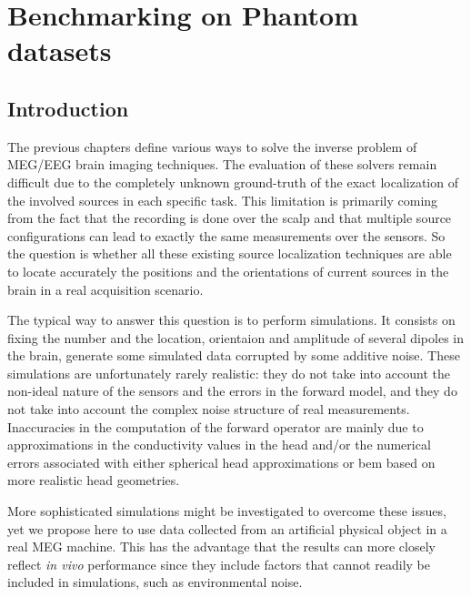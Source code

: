 
\chapter{Benchmarking on Phantom datasets}
\label{chapter:benchmark}
\noindent\makebox[\linewidth]{\rule{0.75\paperwidth}{0.4pt}}
\noindent\makebox[\linewidth]{\rule{0.75\paperwidth}{0.4pt}}

\localtableofcontents %

\noindent\makebox[\linewidth]{\rule{0.75\paperwidth}{0.4pt}}
\noindent\makebox[\linewidth]{\rule{0.75\paperwidth}{0.4pt}}
\newpage

\section{Introduction}
The previous chapters define various ways to solve the inverse problem of MEG/EEG brain imaging techniques. The evaluation of these solvers remain difficult due to the completely unknown ground-truth of the exact localization of the involved sources in each specific task. This limitation is primarily coming from the fact that the recording is done over the scalp and that multiple source configurations can lead to exactly the same measurements over the sensors. So the question is whether all these existing source localization techniques are able to locate accurately the positions and the orientations of current sources in the brain in a real acquisition scenario.

The typical way to answer this question is to perform simulations. It consists on fixing the number and the location, orientaion and amplitude of several dipoles in the brain, generate some simulated data corrupted by some additive noise. These simulations are unfortunately rarely realistic: they do not take into account the non-ideal nature of the sensors and the errors in the forward model, and they do not take into account the complex noise structure of real measurements. Inaccuracies in the computation of the forward operator are mainly due to approximations in the conductivity values in the head and/or the numerical errors associated with either spherical head approximations or \ac{bem} based on more realistic head geometries.

More sophisticated simulations might be investigated to overcome these issues, yet we propose here to use data collected from an artificial physical object in a real MEG machine. This has the advantage that the results can more closely reflect \textit{in vivo} performance since they include factors that cannot readily be included in simulations, such as environmental noise. 


